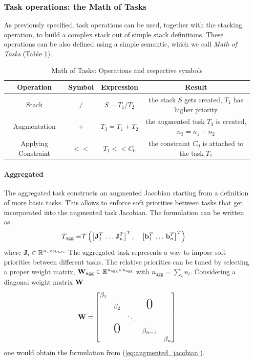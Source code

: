 \subsubsection{Task operations: the Math of Tasks}
As previously specified, task operations can be used, together with the stacking operation, to build a complex stack out of simple stack definitions. These operations can be also defined using a simple semantic, which we call \emph{Math of Tasks} (Table \ref{table:mot}). 

\begin{table}[hbt]
   \begin{center}
   \begin{tabular}{| c | c | c | c |}
   \hline
   Operation & Symbol & Expression & Result \\\hline
   \cline{1-4}
   Stack                & $/$  & $S = T_1 / T_2$    & the stack $S$ gets created, $T_1$ has higher priority  \\\hline
   Augmentation         & $+$  & $T_3 = T_1 + T_2$  & the augmented task $T_3$ is created, $n_3 = n_1 + n_2$ \\\hline
   Applying Constraint  & $<<$ & $T_1 << C_0$       & the constraint $C_0$ is attached to the task $T_1$     \\\hline
   \end{tabular}
   \end{center}
   \caption{Math of Tasks: Operations and respective symbols}
   \label{table:mot}
\end{table}

\paragraph{Aggregated}
The aggregated task constructs an augmented Jacobian starting from a definition of more basic tasks. This allows to enforce soft priorities between tasks that get incorporated into the augmented task Jacobian. The formulation can be written as
\begin{eqnarray}
T_\text{agg} = & \mathcal{T} \left( \left[ \mathbf{J}_{1}^T\, \dotsc \,\mathbf{J}_n^T\right]^T, \quad \left[ \mathbf{b}_{1}^T\, \dotsc \,\mathbf{b}_{n}^T\right]^T \right)
\end{eqnarray}
where $\mathbf{J}_i \in \mathbb{R}^{n_i\times n_{\text{dofs}}}$
The aggregated task represents a way to impose soft priorities between different tasks. The relative priorities can be tuned by selecting a proper weight matrix, $\mathbf{W}_\text{agg} \in \mathbb{R}^{n_{\text{agg}}\times n_\text{agg}}$ with $n_\text{agg}=\sum_in_i$.
Considering a diagonal weight matrix $\mathbf{W}$
\begin{equation}
\W=\begin{bmatrix}
\beta_1                                             \\
&       \beta_2           &      & \text{{\huge{0}}}\\
&       &                 \ddots                    \\
&       \text{{\huge{0}}} &      & \beta_{n-1}      \\
&       &                 &      & \beta_n
\end{bmatrix}
\end{equation}
one would obtain the formulation from (\ref{eq:augmented_jacobian}).

